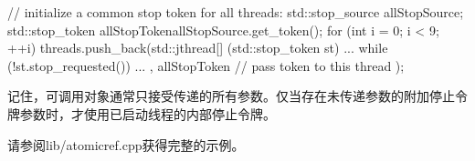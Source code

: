 \begin{cpp}
// initialize a common stop token for all threads:
std::stop_source allStopSource;
std::stop_token allStopToken{allStopSource.get_token()};
for (int i = 0; i < 9; ++i) {
	threads.push_back(std::jthread{[] (std::stop_token st) {
			...
			while (!st.stop_requested()) {
				...
			}
		},
		allStopToken // pass token to this thread
	});
}
\end{cpp}

记住，可调用对象通常只接受传递的所有参数。仅当存在未传递参数的附加停止令牌参数时，才使用已启动线程的内部停止令牌。

请参阅lib/atomicref.cpp获得完整的示例。












